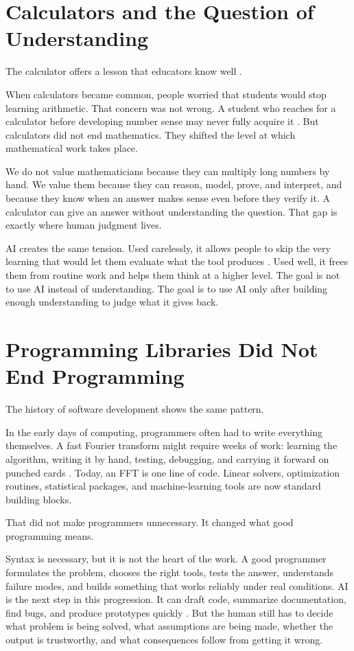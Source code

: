\documentclass[12pt]{article}
\begin{document}
\section{Calculators and the Question of Understanding}

The calculator offers a lesson that educators know well \citep{cuban1986teachers}.

When calculators became common, people worried that students would stop learning arithmetic. That concern was not wrong. A student who reaches for a calculator before developing number sense may never fully acquire it \citep{sweller1988cognitive}. But calculators did not end mathematics. They shifted the level at which mathematical work takes place.

We do not value mathematicians because they can multiply long numbers by hand. We value them because they can reason, model, prove, and interpret, and because they know when an answer makes sense even before they verify it. A calculator can give an answer without understanding the question. That gap is exactly where human judgment lives.

AI creates the same tension. Used carelessly, it allows people to skip the very learning that would let them evaluate what the tool produces \citep{sparrow2011google}. Used well, it frees them from routine work and helps them think at a higher level. The goal is not to use AI instead of understanding. The goal is to use AI only after building enough understanding to judge what it gives back.

\section{Programming Libraries Did Not End Programming}

The history of software development shows the same pattern.

In the early days of computing, programmers often had to write everything themselves. A fast Fourier transform might require weeks of work: learning the algorithm, writing it by hand, testing, debugging, and carrying it forward on punched cards \citep{cooley1965algorithm}. Today, an FFT is one line of code. Linear solvers, optimization routines, statistical packages, and machine-learning tools are now standard building blocks.

That did not make programmers unnecessary. It changed what good programming means.

Syntax is necessary, but it is not the heart of the work. A good programmer formulates the problem, chooses the right tools, tests the answer, understands failure modes, and builds something that works reliably under real conditions. AI is the next step in this progression. It can draft code, summarize documentation, find bugs, and produce prototypes quickly \citep{brynjolfsson2025generative}. But the human still has to decide what problem is being solved, what assumptions are being made, whether the output is trustworthy, and what consequences follow from getting it wrong.
\end{document}

